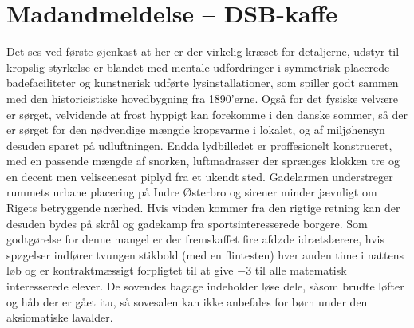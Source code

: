 \begin{minipage}[t]{100mm}
\vspace{1mm}
\section*{Madandmeldelse -- DSB-kaffe}
Det ses ved første øjenkast at her er der virkelig kræset for detaljerne, udstyr til kropslig styrkelse er blandet med mentale udfordringer i symmetrisk placerede badefaciliteter og kunstnerisk udførte lysinstallationer, som spiller godt sammen med den historicistiske hovedbygning fra 1890'erne. Også for det fysiske velvære er sørget, velvidende at frost hyppigt kan forekomme i den danske sommer, så der er sørget for den nødvendige mængde kropsvarme i lokalet, og af miljøhensyn desuden sparet på udluftningen.
Endda lydbilledet er proffesionelt konstrueret, med en passende mængde af snorken, luftmadrasser der sprænges klokken tre og en decent men veliscenesat piplyd fra et ukendt sted. Gadelarmen understreger rummets urbane placering på Indre Østerbro og sirener minder jævnligt om Rigets betryggende nærhed. Hvis vinden kommer fra den rigtige retning kan der desuden bydes på skrål og gadekamp fra sportsinteresserede borgere. Som godtgørelse for denne mangel er der fremskaffet fire afdøde idrætslærere, hvis spøgelser indfører tvungen stikbold (med en flintesten) hver anden time i nattens løb og er kontraktmæssigt forpligtet til at give $-3$ til alle matematisk interesserede elever. 
De sovendes bagage indeholder løse dele, såsom brudte løfter og håb der er gået itu, så sovesalen kan ikke anbefales for børn under den aksiomatiske lavalder.

\end{minipage}


